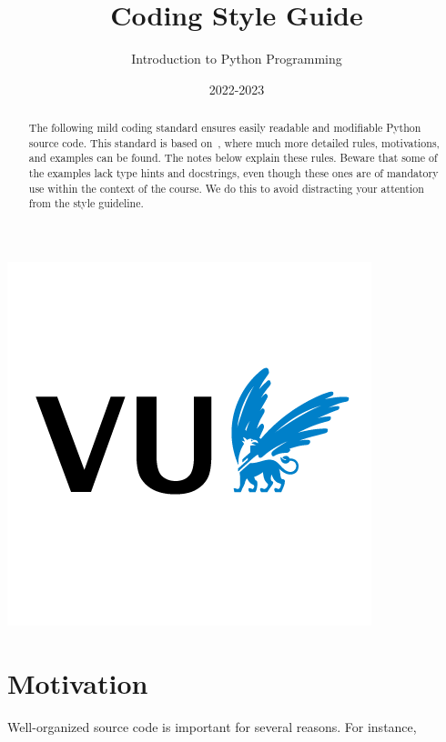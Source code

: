 \documentclass{tufte-handout}
\title{Coding Style Guide}%
\author[Mauricio Verano Merino]{Introduction to Python Programming}
\date{2022-2023} %
\begin{document}
\maketitle%

\begin{marginfigure}[-4cm]%
  \includegraphics[width=\linewidth]{vu}
\end{marginfigure}

\begin{abstract}
\noindent
The following mild coding standard ensures easily readable and modifiable Python source code.
This standard is based on~\cite{rossum2001pep8}, where much more detailed rules, motivations, and examples can be found.
The notes below explain these rules.
Beware that some of the examples lack type hints and docstrings, even though these ones are of mandatory use within the context of the course.
We do this to avoid distracting your attention from the style guideline.
\end{abstract}


\section{Motivation}
Well-organized source code is important for several reasons. For instance,
\end{document}
